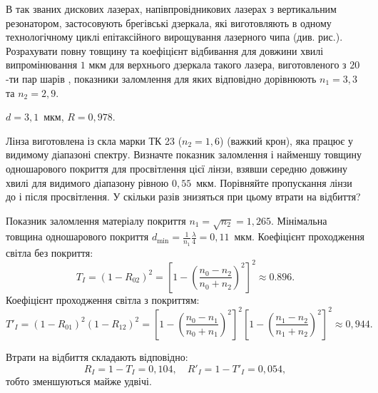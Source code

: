 \begin{problem}%
    В так званих дискових лазерах, напівпровідникових лазерах з вертикальним резонатором, застосовують брегівські дзеркала, які виготовляють в одному технологічному циклі епітаксійного вирощування лазерного чипа (див. рис.). Розрахувати повну товщину та коефіцієнт відбивання для довжини хвилі випромінювання $ 1 $ мкм для верхнього дзеркала такого лазера, виготовленого з $ 20 $-ти пар шарів , показники заломлення для яких відповідно дорівнюють $ n_1= 3,3 $  та $ n_2=2,9 $.

    \begin{center}
    
%
    \end{center}

\begin{solution}
    $ d =  3,1$~мкм, $ R=0,978 $.
\end{solution}
\end{problem}


\begin{problem}%
    Лінза виготовлена із скла марки ТК 23 ($ n_2 = 1,6 $) (важкий крон), яка працює у видимому діапазоні спектру. Визначте показник заломлення і найменшу товщину одношарового покриття для просвітлення цієї лінзи, взявши середню довжину хвилі для видимого діапазону рівною $ 0,55 $~мкм. Порівняйте пропускання лінзи до і після просвітлення. У скільки разів знизяться при цьому втрати на відбиття?
\begin{solution}
    Показник заломлення матеріалу покриття $ n_1 = \sqrt{n_2} = 1,265  $.
    Мінімальна товщина одношарового покриття $ d_{\min} =  \frac{1}{n_1}\frac\lambda4 = 0,11$~мкм.
    Коефіцієнт проходження світла без покриття:
    \begin{equation*}
        T_I = (1 - R_{02})^2 = \left[ 1 - \left( \frac{n_0 - n_2}{n_0 + n_2}\right)^2 \right]^2 \approx 0.896.
    \end{equation*}
     Коефіцієнт проходження світла з покриттям:
     \begin{equation*}
         T'_I = (1 - R_{01})^2 (1 - R_{12})^2 = \left[ 1 - \left( \frac{n_0 - n_1}{n_0 + n_1}\right)^2 \right]^2 \left[ 1 - \left( \frac{n_1 - n_2}{n_1 + n_2}\right)^2 \right]^2 \approx 0,944.
     \end{equation*}

     Втрати на відбиття складають відповідно:
     \begin{equation*}
         R_I = 1 - T_I = 0,104, \quad R'_I = 1- T'_I = 0,054,
     \end{equation*}
     тобто зменшуються майже удвічі.
\end{solution}
\end{problem}




